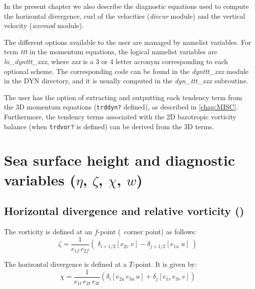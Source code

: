\documentclass[../main/NEMO_manual]{subfiles}
\begin{document}
In the present chapter we also describe the diagnostic equations used to compute the horizontal divergence,
curl of the velocities (\emph{divcur} module) and the vertical velocity (\emph{wzvmod} module).

The different options available to the user are managed by namelist variables.
For term \textit{ttt} in the momentum equations, the logical namelist variables are \textit{ln\_dynttt\_xxx},
where \textit{xxx} is a 3 or 4 letter acronym corresponding to each optional scheme.
The corresponding code can be found in the \textit{dynttt\_xxx} module in the DYN directory,
and it is usually computed in the \textit{dyn\_ttt\_xxx} subroutine.

The user has the option of extracting and outputting each tendency term from the 3D momentum equations
(\texttt{trddyn?} defined), as described in \autoref{chap:MISC}.
Furthermore, the tendency terms associated with the 2D barotropic vorticity balance (when \texttt{trdvor?} is defined)
can be derived from the 3D terms.

\section{Sea surface height and diagnostic variables ($\eta$, $\zeta$, $\chi$, $w$)}
\label{sec:DYN_divcur_wzv}

\subsection[Horizontal divergence and relative vorticity (\textit{divcur.F90})]{Horizontal divergence and relative vorticity (\protect{})}
\label{subsec:DYN_divcur}

The vorticity is defined at an $f$-point (\ie\ corner point) as follows:
\begin{equation}
  \label{eq:DYN_divcur_cur}
  \zeta =\frac{1}{e_{1f}\,e_{2f} }\left( {\;\delta_{i+1/2} \left[ {e_{2v}\;v} \right]
      -\delta_{j+1/2} \left[ {e_{1u}\;u} \right]\;} \right)
\end{equation}

The horizontal divergence is defined at a $T$-point.
It is given by:
\[
  \chi =\frac{1}{e_{1t}\,e_{2t}\,e_{3t} }
  \left( {\delta_i \left[ {e_{2u}\,e_{3u}\,u} \right]
      +\delta_j \left[ {e_{1v}\,e_{3v}\,v} \right]} \right)
\]
\end{document}
